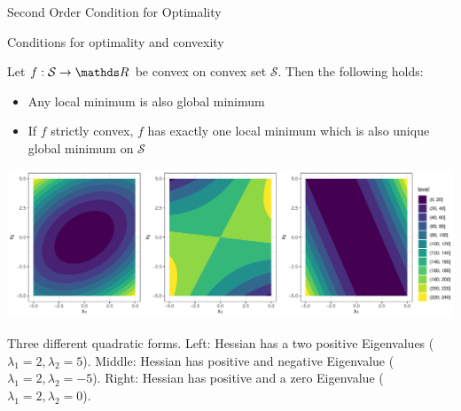 \documentclass[11pt,compress,t,notes=noshow, xcolor=table]{beamer}
\begin{document}
\begin{vbframe}{Second Order Condition for Optimality}


  
  \end{vbframe}

\begin{vbframe}{Conditions for optimality and convexity}

Let $f:\mathcal{S} \to \R$ be convex on convex set $\mathcal{S}$. Then the following holds:

\begin{itemize}
\item Any local minimum is also global minimum 
\item If $f$ strictly convex, $f$ has exactly one local minimum which is also unique global minimum on $\mathcal{S}$
\end{itemize}

\begin{center}
\includegraphics[width = 1\textwidth]{figure_man/hessian-eigenvalues.pdf} \\
\vspace*{0.3cm}
\begin{tiny}
  Three different quadratic forms. Left: Hessian has a two positive Eigenvalues ($\lambda_1 = 2, \lambda_2 = 5$). Middle: Hessian has positive and negative Eigenvalue ($\lambda_1 = 2, \lambda_2 = - 5$). Right: Hessian has positive and a zero Eigenvalue ($\lambda_1 = 2, \lambda_2 = 0$).%
\end{tiny}
\end{center}


\framebreak 


\end{vbframe}
\end{document}

